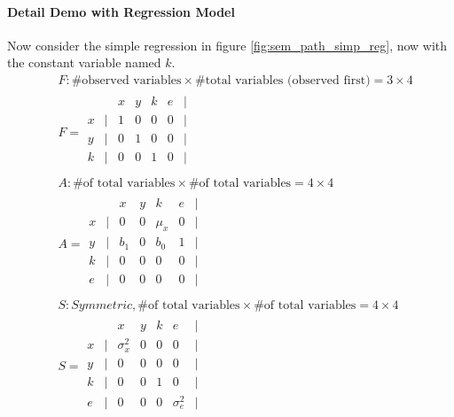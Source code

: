 \paragraph{Detail Demo with Regression Model} 
Now consider the simple regression in figure \ref{fig:sem_path_simp_reg}, now with the constant variable named $k$. 
    \begin{align*}
        & F: \text{\# observed variables} \times \text{\# total variables (observed first)} = 3 \times 4\\
        & F = \begin{matrix}
              &   & x & y & k & e & |\\
            x & | & 1 & 0 & 0 & 0 & |\\
            y & | & 0 & 1 & 0 & 0 & |\\
            k & | & 0 & 0 & 1 & 0 & |\\
        \end{matrix} \\
        & A: \text{\# of total variables} \times \text{\# of total variables} = 4 \times 4\\
        & A = \begin{matrix}
              &   & x & y & k & e & | \\
            x & | & 0 & 0 & \mu_x & 0 & |\\
            y & | & b_1 & 0 & b_0 & 1 & |\\
            k & | & 0 & 0 & 0 & 0 & |\\
            e & | & 0 & 0 & 0 & 0 & |\\
        \end{matrix}\\
        & S: Symmetric, \text{\# of total variables} \times \text{\# of total variables} = 4 \times 4\\
        & S = \begin{matrix}
              &   & x & y & k & e & | \\
            x & | & \sigma_x^2 & 0 & 0 & 0 & |\\
            y & | & 0 & 0 & 0 & 0 & |\\
            k & | & 0 & 0 & 1 & 0 & |\\
            e & | & 0 & 0 & 0 & \sigma_e^2 & |\\
        \end{matrix}
    \end{align*}

